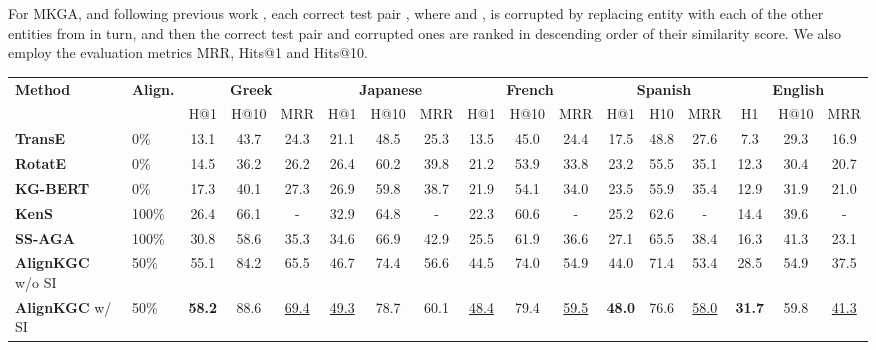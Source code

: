 \documentclass[11pt]{article}
\begin{document}
For MKGA, and following previous work \cite{MTransE,wu2019relation,sun2020knowledge,singh2021multilingual}, each correct test pair , where  and , is corrupted by replacing entity  with each of the other entities from  in turn, and then the correct test pair and corrupted ones are ranked in descending order of
their similarity score. We also employ the evaluation metrics MRR, Hits@1 and Hits@10. 





\begin{table*}[!t]
    \begin{adjustbox}{width=440pt,center}
    \centering
    \setlength{\tabcolsep}{0.2em}
    \def\arraystretch{1.1}
    \begin{tabular}{l|l|ccc|ccc|ccc|ccc|ccc}
\hline
    \multirow{2}{*}{\bf Method} & 
    \multirow{2}{*}{\bf Align.} &
    \multicolumn{3}{c|}{\bf Greek} &
    \multicolumn{3}{c|}{\bf Japanese} &
    \multicolumn{3}{c|}{\bf French} &
    \multicolumn{3}{c|}{\bf Spanish} &
    \multicolumn{3}{c}{\bf English} \\
    \cline{3-17} 
    & & H@1 & H@10 & MRR & H@1 & H@10 & MRR & H@1 & H@10 & MRR & H@1 & H10 & MRR & H1 & H@10 & MRR \\
    \hline
    \bf TransE & 0\% & 13.1 & 43.7 & 24.3 & 21.1 & 48.5 & 25.3 & 13.5 & 45.0 & 24.4 & 17.5 & 48.8 & 27.6 & 7.3 & 29.3 & 16.9 \\
    \bf RotatE & 0\% & 14.5 & 36.2 & 26.2 & 26.4 & 60.2 & 39.8 & 21.2 & 53.9 & 33.8 & 23.2 & 55.5 & 35.1 & 12.3 & 30.4 & 20.7 \\
    \bf KG-BERT & 0\% & 17.3 & 40.1 & 27.3 & 26.9 & 59.8 & 38.7 & 21.9 & 54.1 & 34.0 & 23.5 & 55.9 & 35.4 & 12.9 & 31.9 & 21.0\\
    \hline
    \bf KenS & 100\% & 26.4 & 66.1 & - & 32.9 & 64.8 & - & 22.3 & 60.6 & - & 25.2 & 62.6 & - & 14.4 & 39.6 & - \\
    \bf SS-AGA & 100\% & 30.8 & 58.6 & 35.3 & 34.6 & 66.9 & 42.9 & 25.5 & 61.9 & 36.6 & 27.1 & 65.5 & 38.4 & 16.3 & 41.3 & 23.1 \\
    
    \textbf{AlignKGC} w/o SI & 50\% & 55.1 & 84.2 & 65.5 & 46.7 & 74.4 & 56.6 & 44.5 & 74.0 & 54.9 & 44.0 & 71.4 & 53.4 & 28.5 & 54.9 & 37.5 \\
    
    \textbf{AlignKGC} w/ SI & 50\% & \bf 58.2 & 88.6 & \underline{69.4} & \underline{49.3} & 78.7 & 60.1 & \underline{48.4} & 79.4 & \underline{59.5} & \bf 48.0 & 76.6 & \underline{58.0} & \bf 31.7 & 59.8 & \underline{41.3} \\
    

\end{tabular}
\end{adjustbox}
\end{table*}
\end{document}

